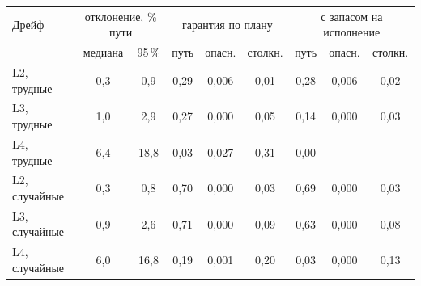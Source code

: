 \begin{tabular}{l|cc|ccc|ccc}
\toprule
Дрейф & \multicolumn{2}{c|}{отклонение, \% пути} & \multicolumn{3}{c|}{гарантия по плану} & \multicolumn{3}{c}{с запасом на исполнение} \\
 & медиана & 95\,\% & путь & опасн. & столкн. & путь & опасн. & столкн. \\
\midrule
L2, трудные & 0{,}3 & 0{,}9 & 0{,}29 & 0{,}006 & 0{,}01 & 0{,}28 & 0{,}006 & 0{,}02 \\
L3, трудные & 1{,}0 & 2{,}9 & 0{,}27 & 0{,}000 & 0{,}05 & 0{,}14 & 0{,}000 & 0{,}03 \\
L4, трудные & 6{,}4 & 18{,}8 & 0{,}03 & 0{,}027 & 0{,}31 & 0{,}00 & --- & --- \\
L2, случайные & 0{,}3 & 0{,}8 & 0{,}70 & 0{,}000 & 0{,}03 & 0{,}69 & 0{,}000 & 0{,}03 \\
L3, случайные & 0{,}9 & 2{,}6 & 0{,}71 & 0{,}000 & 0{,}09 & 0{,}63 & 0{,}000 & 0{,}08 \\
L4, случайные & 6{,}0 & 16{,}8 & 0{,}19 & 0{,}001 & 0{,}20 & 0{,}03 & 0{,}000 & 0{,}13 \\
\bottomrule
\end{tabular}
